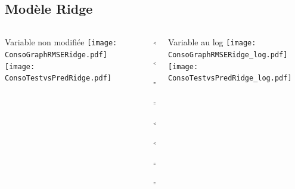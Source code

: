\documentclass[8pt,aspectratio=169,hyperref={unicode=true}]{beamer}
\begin{document}
\subsection{Modèle Ridge}
\begin{frame}{\insertsubsection}
  \begin{columns}[t]
    \begin{column}{.31\textwidth}
      \centering Variable non modifiée
      \texttt{[image: ConsoGraphRMSERidge.pdf]}
      \texttt{[image: ConsoTestvsPredRidge.pdf]}
    \end{column}
    \begin{column}{.38\textwidth}
      $\Longleftarrow$

      {\footnotesize
          }

      $\Longleftarrow$

      \raggedleft
      $\Longrightarrow$

      {\footnotesize
          }

      $\Longrightarrow$

      \vspace{1cm}

      \raggedright
      $\Longleftarrow$
      {\scriptsize
          }

      $\Longleftarrow$

      \raggedleft
      $\Longrightarrow$

      {\scriptsize
          
        }

      $\Longrightarrow$
    \end{column}
    \begin{column}{.31\textwidth}
      \centering Variable au log
      \texttt{[image: ConsoGraphRMSERidge\_log.pdf]}
      \texttt{[image: ConsoTestvsPredRidge\_log.pdf]}
    \end{column}
  \end{columns}
\end{frame}
\end{document}
